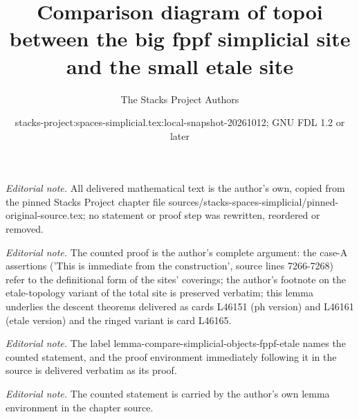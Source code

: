 \documentclass{stacks-project}
\title{Comparison diagram of topoi between the big fppf simplicial site and the small etale site}
\author{The Stacks Project Authors}
\date{stacks-project:spaces-simplicial.tex:local-snapshot-20261012; GNU FDL 1.2 or later}
\theoremstyle{plain}
\theoremstyle{definition}
\theoremstyle{remark}
\numberwithin{equation}{subsection}
\begin{document}
\maketitle
\noindent\textit{Editorial note.} All delivered mathematical text is the author's own, copied from the pinned Stacks Project chapter file sources/stacks-spaces-simplicial/pinned-original-source.tex; no statement or proof step was rewritten, reordered or removed.\par\medskip
\noindent\textit{Editorial note.} The counted proof is the author's complete argument: the case-A assertions ('This is immediate from the construction', source lines 7266-7268) refer to the definitional form of the sites' coverings; the author's footnote on the etale-topology variant of the total site is preserved verbatim; this lemma underlies the descent theorems delivered as cards L46151 (ph version) and L46161 (etale version) and the ringed variant is card L46165.\par\medskip
\noindent\textit{Editorial note.} The label lemma-compare-simplicial-objects-fppf-etale names the counted statement, and the proof environment immediately following it in the source is delivered verbatim as its proof.\par\medskip
\noindent\textit{Editorial note.} The counted statement is carried by the author's own lemma environment in the chapter source.\par\medskip
\end{document}
